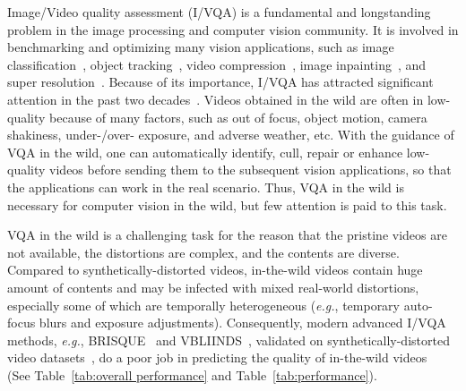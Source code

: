 \documentclass[twocolumn]{svjour3}          \smartqed  \usepackage{graphicx}
\begin{document}
Image/Video quality assessment (I/VQA) is a fundamental and longstanding problem in the image processing and computer vision community.
It is involved in benchmarking and optimizing many vision applications, such as image classification~\citep{dodge2016understanding}, object tracking~\citep{nieto2019video}, video compression~\citep{rippel2019learned}, image inpainting~\citep{isogawa2019better}, and super resolution~\citep{zhang2019ranksrgan}. 
Because of its importance, I/VQA has attracted significant attention in the past two decades~\citep{wang2004image,mittal2012no,zhang2014vsi,kang2014convolutional,ma2016group,liu2017rankiqa,kim2018deep,lin2018hallucinated}. 
Videos obtained in the wild are often in low-quality because of many factors, such as  out of focus, object motion, camera shakiness, under-/over- exposure, and adverse weather, etc. 
With the guidance of VQA in the wild, one can automatically identify, cull, repair or enhance low-quality videos before sending them to the subsequent vision applications, so that the applications can work in the real scenario.
Thus, VQA in the wild is necessary for computer vision in the wild, but few attention is paid to this task.

VQA in the wild is a challenging task for the reason that the pristine videos are not available, the distortions are complex, and the contents are diverse. 
Compared to synthetically-distorted videos, in-the-wild videos contain huge amount of contents and may be infected with mixed real-world distortions, especially some of which are temporally heterogeneous (\textit{e.g.}, temporary auto-focus blurs and exposure adjustments).
Consequently, modern advanced I/VQA methods, \textit{e.g.}, BRISQUE~\citep{mittal2012no} and VBLIINDS~\citep{saad2014blind}, validated on synthetically-distorted video datasets~\citep{seshadrinathan2010study,moorthy2012video}, do a poor job in predicting the quality of in-the-wild videos~\citep{men2017empirical,ghadiyaram2018capture,nuutinen2016cvd2014,sinno2019large} (See Table~\ref{tab:overall performance} and Table~\ref{tab:performance}). 
\end{document}
